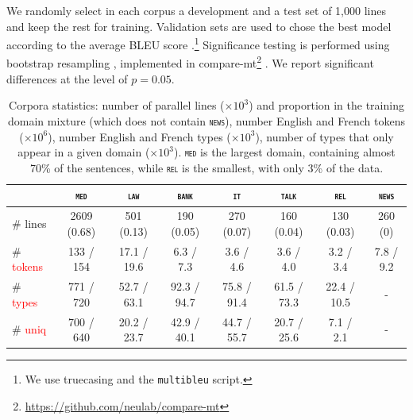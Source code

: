 \documentclass[11pt,a4paper]{article}
\newcommand{\fyDone}[1]{\done[FY]\Todo[FY:]{\textcolor{orange}{#1}}}
\newcommand{\revision}[1]{\textcolor{red}{#1}}
\newcommand{\domain}[1]{\texttt{\textsc{#1}}}
\begin{document}
We randomly select in each corpus a development and a test set of 1,000 lines and keep the rest for training. Validation sets are used to chose the best model according to the average BLEU score \cite{Papineni02bleu}.\footnote{We use truecasing and the \texttt{multibleu} script.}\fyDone{A word about meta-parameter settings} Significance testing is performed using bootstrap resampling \cite{Koehn04statistical}, implemented in compare-mt\footnote{\url{https://github.com/neulab/compare-mt}} \cite{Neubig19compare-mt}. We report significant differences at the level of $p=0.05$.\fyDone{Fix correct p value}


\begin{table}[htbp]
  \centering
  \begin{tabular}{|l|ccccccc|} %
    \cline{2-8} 
    \multicolumn{1}{c|}{} & \multicolumn{1}{c}{\domain{med}} & \multicolumn{1}{c}{\domain{law}} & \multicolumn{1}{c}{\domain{bank}} & \multicolumn{1}{c}{\domain{it}} & \multicolumn{1}{c}{\domain{talk}} & \multicolumn{1}{c}{\domain{rel}} & \multicolumn{1}{c|}{\domain{news}} \\
    \hline 
    \# lines & 2609 (0.68) & 501 (0.13) & 190 (0.05) & 270 (0.07) & 160 (0.04) & 130 (0.03) & 260 (0) \\
    \# \revision{tokens}  &  133 / 154  &  17.1 / 19.6 &  6.3 / 7.3 &  3.6 / 4.6 &  3.6 / 4.0 &  3.2 / 3.4 & 7.8 / 9.2   \\
    \# \revision{types}  & 771 / 720 & 52.7 / 63.1 & 92.3 / 94.7 & 75.8 / 91.4 & 61.5 / 73.3 & 22.4 / 10.5 & - \\
    \# \revision{uniq} & 700 / 640 & 20.2 / 23.7 & 42.9 / 40.1 & 44.7 / 55.7 & 20.7 / 25.6 & 7.1 / 2.1 & - \\
    \hline
  \end{tabular}
  \caption{Corpora statistics: number of parallel lines ($\times 10^3$) and proportion in the training domain mixture (which does not contain \domain{news}), number English and French tokens ($\times 10^6$), number English and French types ($\times 10^3$), number of types that only appear in a given domain ($\times 10^3$). \domain{med} is the largest domain, containing almost 70\% of the sentences, while \domain{rel} is the smallest, with only 3\% of the data.
  }
\label{tab:Corpora}
\end{table}
\end{document}
